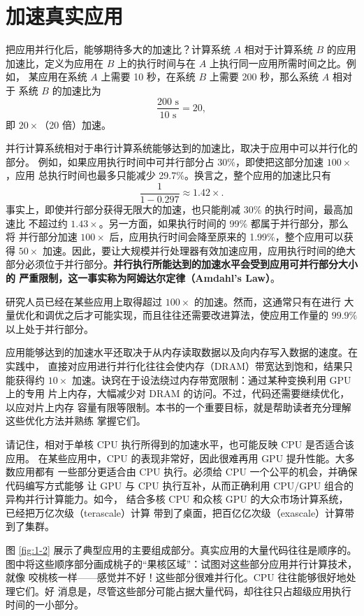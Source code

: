 \section{加速真实应用}
\label{sec:speeding-up-real-applications}

把应用并行化后，能够期待多大的加速比？计算系统 $A$ 相对于计算系统 $B$ 的应用
加速比，定义为应用在 $B$ 上的执行时间与在 $A$ 上执行同一应用所需时间之比。例如，
某应用在系统 $A$ 上需要 10 秒，在系统 $B$ 上需要 200 秒，那么系统 $A$ 相对于
系统 $B$ 的加速比为
\[
  \frac{200\text{ s}}{10\text{ s}}=20,
\]
即 $20\times$（20 倍）加速。

并行计算系统相对于串行计算系统能够达到的加速比，取决于应用中可以并行化的部分。
例如，如果应用执行时间中可并行部分占 30\%，即使把这部分加速 $100\times$，应用
总执行时间也最多只能减少 29.7\%。换言之，整个应用的加速比只有
\[
  \frac{1}{1-0.297}\approx 1.42\times.
\]
事实上，即使并行部分获得无限大的加速，也只能削减 30\% 的执行时间，最高加速比
不超过约 $1.43\times$。另一方面，如果执行时间的 99\% 都属于并行部分，那么将
并行部分加速 $100\times$ 后，应用执行时间会降至原来的 1.99\%，整个应用可以获得
$50\times$ 加速。因此，要让大规模并行处理器有效加速应用，应用执行时间的绝大
部分必须位于并行部分。\textbf{并行执行所能达到的加速水平会受到应用可并行部分大小的
严重限制，这一事实称为阿姆达尔定律（Amdahl's Law）}\cite{amdahl2013}。

研究人员已经在某些应用上取得超过 $100\times$ 的加速。然而，这通常只有在进行
大量优化和调优之后才可能实现，而且往往还需要改进算法，使应用工作量的
$99.9\%$ 以上处于并行部分。

应用能够达到的加速水平还取决于从内存读取数据以及向内存写入数据的速度。在实践中，
直接对应用进行并行化往往会使内存（DRAM）带宽达到饱和，结果只能获得约
$10\times$ 加速。诀窍在于设法绕过内存带宽限制：通过某种变换利用 GPU 上的专用
片上内存，大幅减少对 DRAM 的访问。不过，代码还需要继续优化，以应对片上内存
容量有限等限制。本书的一个重要目标，就是帮助读者充分理解这些优化方法并熟练
掌握它们。

请记住，相对于单核 CPU 执行所得到的加速水平，也可能反映 CPU 是否适合该应用。
在某些应用中，CPU 的表现非常好，因此很难再用 GPU 提升性能。大多数应用都有
一些部分更适合由 CPU 执行。必须给 CPU 一个公平的机会，并确保代码编写方式能够
让 GPU 与 CPU 执行互补，从而正确利用 CPU/GPU 组合的异构并行计算能力。如今，
结合多核 CPU 和众核 GPU 的大众市场计算系统，已经把万亿次级（terascale）计算
带到了桌面，把百亿亿次级（exascale）计算带到了集群。

图 \ref{fig:1-2} 展示了典型应用的主要组成部分。真实应用的大量代码往往是顺序的。
图中将这些顺序部分画成桃子的“果核区域”：试图对这些部分应用并行计算技术，就像
咬桃核一样——感觉并不好！这些部分很难并行化。CPU 往往能够很好地处理它们。好
消息是，尽管这些部分可能占据大量代码，却往往只占超级应用执行时间的一小部分。

